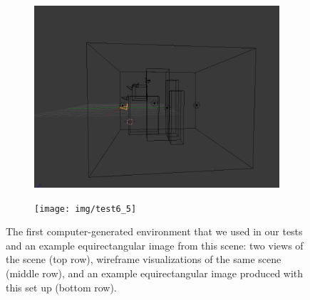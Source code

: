 \begin{figure}
\begin{subfigure}{0.4\textwidth}
		\includegraphics[width=\textwidth]{img/test6_4}
	\end{subfigure}
	\begin{subfigure}{0.8\textwidth}
		\centering
		\texttt{[image: img/test6\_5]}
	\end{subfigure}
	\caption{The first computer-generated environment that we used in our tests and
	an example equirectangular image from this scene: two views of the scene (top row),
	wireframe visualizations of the same scene (middle row), and an example
	equirectangular image produced with this set up (bottom row).}
    \label{fig:test6}
\end{figure}
%

